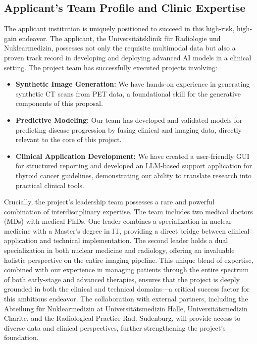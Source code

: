 \documentclass[11pt, a4paper]{article}
\begin{document}
\subsection{Applicant’s Team Profile and Clinic Expertise}
The applicant institution is uniquely positioned to succeed in this high-risk, high-gain endeavor. The applicant, the Universitätsklinik für Radiologie und Nuklearmedizin, possesses not only the requisite multimodal data but also a proven track record in developing and deploying advanced AI models in a clinical setting. The project team has successfully executed projects involving:
\begin{itemize}
    \item \textbf{Synthetic Image Generation:} We have hands-on experience in generating synthetic CT scans from PET data, a foundational skill for the generative components of this proposal.
    \item \textbf{Predictive Modeling:} Our team has developed and validated models for predicting disease progression by fusing clinical and imaging data, directly relevant to the core of this project.
    \item \textbf{Clinical Application Development:} We have created a user-friendly GUI for structured reporting and developed an LLM-based support application for thyroid cancer guidelines, demonstrating our ability to translate research into practical clinical tools.
\end{itemize}
Crucially, the project's leadership team possesses a rare and powerful combination of interdisciplinary expertise. The team includes two medical doctors (MDs) with medical PhDs. One leader combines a specialization in nuclear medicine with a Master's degree in IT, providing a direct bridge between clinical application and technical implementation. The second leader holds a dual specialization in both nuclear medicine and radiology, offering an invaluable holistic perspective on the entire imaging pipeline. This unique blend of expertise, combined with our experience in managing patients through the entire spectrum of both early-stage and advanced therapies, ensures that the project is deeply grounded in both the clinical and technical domains—a critical success factor for this ambitious endeavor. The collaboration with external partners, including the Abteilung für Nuklearmedizin at Universitätsmedizin Halle, Universitätsmedizin Charite, and the Radiological Practice Rad. Sudenburg, will provide access to diverse data and clinical perspectives, further strengthening the project's foundation.
\end{document}
